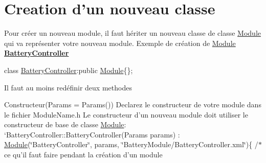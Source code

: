 \section*{Creation d'un nouveau classe}

Pour créer un nouveau module, il faut hériter un nouveau classe de classe \hyperlink{classModule}{Module} qui va représenter votre nouveau module. Exemple de création de \hyperlink{classModule}{Module} {\bfseries \hyperlink{classBatteryController}{Battery\-Controller}}

{\ttfamily class \hyperlink{classBatteryController}{Battery\-Controller}\-:public \hyperlink{classModule}{Module}\{\};}

Il faut au moins redéfinir deux methodes
\begin{DoxyItemize}
\item Constructeur(Params = Params()) Declarez le constructeur de votre module dans le fichier Module\-Name.\-h Le constructeur d'un nouveau module doit utiliser le constructeur de base de classe \hyperlink{classModule}{Module}\-: `\-Battery\-Controller\-::\-Battery\-Controller(\-Params params) \-: \hyperlink{classModule}{Module}(\char`\"{}\-Battery\-Controller\char`\"{}, params, \char`\"{}\-Battery\-Module/\-Battery\-Controller.\-xml\char`\"{})\{ /$\ast$ ce qu'il faut faire pendant la création d'un module 
\end{DoxyItemize}